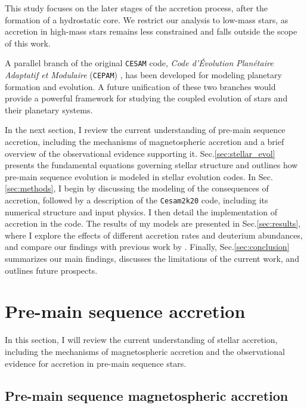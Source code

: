 \documentclass[12pt,a4paper]{article}
\begin{document}
This study focuses on the later stages of the accretion process, after the formation of a hydrostatic core. We restrict our analysis to low-mass stars, as accretion in high-mass stars remains less constrained and falls outside the scope of this work.

A parallel branch of the original \texttt{CESAM} code, \textit{Code d'Évolution Planétaire Adaptatif et Modulaire} (\texttt{CEPAM}) \parencite{GuillotMorel1995}, has been developed for modeling planetary formation and evolution. A future unification of these two branches would provide a powerful framework for studying the coupled evolution of stars and their planetary systems.

In the next section, I review the current understanding of pre-main sequence accretion, including the mechanisms of magnetospheric accretion and a brief overview of the observational evidence supporting it. Sec.\ref{sec:stellar_evol} presents the fundamental equations governing stellar structure and outlines how pre-main sequence evolution is modeled in stellar evolution codes. In Sec.\ref{sec:methods}, I begin by discussing the modeling of the consequences of accretion, followed by a description of the \texttt{Cesam2k20} code, including its numerical structure and input physics. I then detail the implementation of accretion in the code. The results of my models are presented in Sec.\ref{sec:results}, where I explore the effects of different accretion rates and deuterium abundances, and compare our findings with previous work by \textcite{PallaStahler1993}. Finally, Sec.\ref{sec:conclusion} summarizes our main findings, discusses the limitations of the current work, and outlines future prospects.

\section{Pre-main sequence accretion}
\label{sec:background}

In this section, I will review the current understanding of stellar accretion, including the mechanisms of magnetospheric accretion and the observational evidence for accretion in pre-main sequence stars. 

\subsection{Pre-main sequence magnetospheric accretion}
\label{sec:magnetospheric_accretion}
\end{document}
